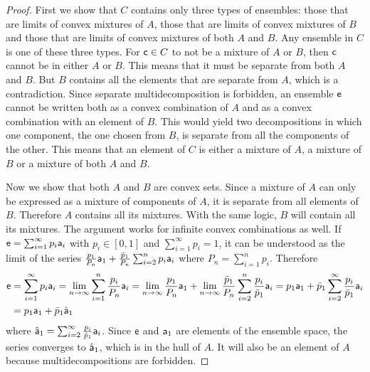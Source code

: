 \begin{mathSection}
	\begin{proof}
		First we show that $C$ contains only three types of ensembles: those that are limits of convex mixtures of $A$, those that are limits of convex mixtures of $B$ and those that are limits of convex mixtures of both $A$ and $B$. Any ensemble in $C$ is one of these three types. For $\ens[c] \in C$ to not be a mixture of $A$ or $B$, then $\ens[c]$ cannot be in either $A$ or $B$. This means that it must be separate from both $A$ and $B$. But $B$ contains all the elements that are separate from $A$, which is a contradiction. Since separate multidecomposition is forbidden, an ensemble $\ens$ cannot be written both as a convex combination of $A$ and as a convex combination with an element of $B$. This would yield two decompositions in which one component, the one chosen from $B$, is separate from all the components of the other. This means that an element of $C$ is either a mixture of $A$, a mixture of $B$ or a mixture of both $A$ and $B$.
		
		Now we show that both $A$ and $B$ are convex sets. Since a mixture of $A$ can only be expressed as a mixture of components of $A$, it is separate from all elements of $B$. Therefore $A$ contains all its mixtures. With the same logic, $B$ will contain all its mixtures. The argument works for infinite convex combinations as well. If $\ens = \sum_{i=1}^{\infty} p_i \ens[a]_i$ with $p_i \in [0,1]$ and $\sum_{i=1}^{\infty} p_i = 1$, it can be understood as the limit of the series $\frac{p_1}{P_n} \ens[a]_1 + \frac{\bar{p}_1}{P_n} \sum_{i=2}^{n} p_i \ens[a]_i$ where $P_n = \sum_{i=1}^{n} p_i$. Therefore
		\begin{equation}
			\begin{aligned}
				\ens &= \sum_{i=1}^{\infty} p_i \ens[a]_i = \lim\limits_{n \to \infty}  \sum_{i=1}^{n} \frac{p_i}{P_n} \ens[a]_i = \lim\limits_{n \to \infty} \frac{p_1}{P_n} \ens[a]_1 + \lim\limits_{n \to \infty}\frac{\bar{p}_1}{P_n} \sum_{i=2}^{n} \frac{p_i}{\bar{p}_1} \ens[a]_i = p_1 \ens[a]_1 + \bar{p}_1 \sum_{i=2}^{\infty} \frac{p_i}{\bar{p}_1} \ens[a]_i \\
				&= p_1 \ens[a]_1 + \bar{p}_1 \hat{\ens[a]}_1
			\end{aligned}
		\end{equation}
		where $\hat{\ens[a]}_1 = \sum_{i=2}^{\infty} \frac{p_i}{\bar{p}_1} \ens[a]_i$. Since $\ens$ and $\ens[a]_1$ are elements of the ensemble space, the series converges to $\hat{\ens[a]}_1$, which is in the hull of $A$. It will also be an element of $A$ because multidecompositions are forbidden.
		

\end{proof}
\end{mathSection}
